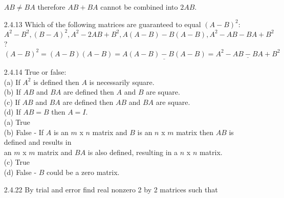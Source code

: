 \documentclass[10pt,twoside,reqno]{article}
\begin{document}
\begin{enumerate}
$AB \neq BA$ therefore $AB+BA$ cannot be combined into $2AB$. \\
\item[2.4.13]Which of the following matrices are guaranteed to equal $(A - B)^2$:\hspace{15pt}$A^2 - B^2, (B - A)^2, A^2 - 2AB + B^2, A(A - B) - B(A - B), A^2 - AB - BA + B^2$? \\
\vspace{3mm}
\hspace{30pt}$(A-B)^2=(A-B)(A-B)=\underline{A(A-B)-B(A-B)}=\underline{A^2-AB-BA+B^2}$
\item[2.4.14]True or false: \\
\hspace{15pt}(a) If $A^2$ is defined then $A$ is necessarily square. \\
\hspace{15pt}(b) If $AB$ and $BA$ are defined then $A$ and $B$ are square. \\
\hspace{15pt}(c) If $AB$ and $BA$ are defined then $AB$ and $BA$ are square. \\
\hspace{15pt}(d) If $A B = B$ then $A = I$. \\
\vspace{3mm}
\hspace{15pt}(a) True \\
\hspace{15pt}(b) False - If $A$ is an $m$ x $n$ matrix and $B$ is an $n$ x $m$ matrix then $AB$ is defined and results in\\ \hspace{40pt} an $m$ x $m$ matrix and $BA$ is also defined, resulting in a $n$ x $n$ matrix. \\
\hspace{15pt}(c) True \\
\hspace{15pt}(d) False - $B$ could be a zero matrix. \\
\item[2.4.22]By trial and error find real nonzero 2 by 2 matrices such that \\
\vspace{3mm}

\end{enumerate}
\end{document}
